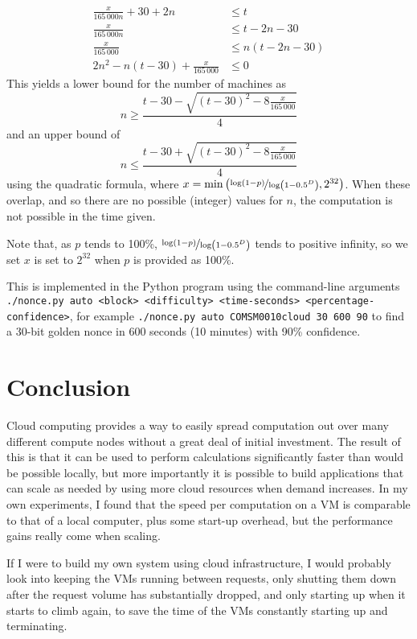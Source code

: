 \documentclass[letterpaper,twocolumn,11pt]{article}
\begin{document}
\begin{align*}
    \frac{x}{165\,000n}+30+2n &\leq t\\
    \frac{x}{165\,000n} &\leq t-2n-30\\
    \frac{x}{165\,000} &\leq n\left(t-2n-30\right)\\
    2n^2 - n\left(t-30\right) + \frac{x}{165\,000} &\leq 0
\end{align*}
This yields a lower bound for the number of machines as $$n \geq \frac{t-30-\sqrt{\left(t-30\right)^2-8\frac{x}{165\,000}}}{4}$$ and an upper bound of $$n \leq \frac{t-30+\sqrt{\left(t-30\right)^2-8\frac{x}{165\,000}}}{4}$$ using the quadratic formula, where $x = \min\left(\nicefrac{\log\left(1-p\right)}{\log\left(1-0.5^D\right)},2^{32}\right)$. When these overlap, and so there are no possible (integer) values for $n$, the computation is not possible in the time given.

Note that, as $p$ tends to 100\%, $\nicefrac{\log\left(1-p\right)}{\log\left(1-0.5^D\right)}$ tends to positive infinity, so we set $x$ is set to $2^{32}$ when $p$ is provided as 100\%.

This is implemented in the Python program using the command-line arguments \texttt{./nonce.py auto <block> <difficulty> <time-seconds> <percentage-confidence>}, for example \verb|./nonce.py auto COMSM0010cloud 30 600 90| to find a 30-bit golden nonce in 600 seconds (10 minutes) with 90\% confidence.

\section{Conclusion}

Cloud computing provides a way to easily spread computation out over many different compute nodes without a great deal of initial investment. The result of this is that it can be used to perform calculations significantly faster than would be possible locally, but more importantly it is possible to build applications that can scale as needed by using more cloud resources when demand increases. In my own experiments, I found that the speed per computation on a VM is comparable to that of a local computer, plus some start-up overhead, but the performance gains really come when scaling.

If I were to build my own system using cloud infrastructure, I would probably look into keeping the VMs running between requests, only shutting them down after the request volume has substantially dropped, and only starting up when it starts to climb again, to save the time of the VMs constantly starting up and terminating.
\end{document}
